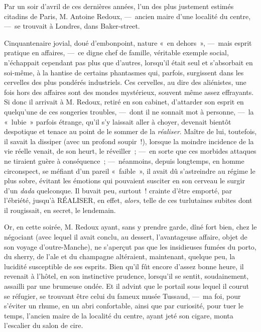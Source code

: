 \documentclass[french,twoside]{book} %
\newcommand{\bibl}[1]{{\RaggedLeft{#1}\par\bigskip}}
\begin{document}
\bibl{Xavier Aubryet.}
\noindent Par un soir d’avril de ces dernières années, l’un des plus justement estimés citadins de Paris, M. Antoine Redoux, — ancien maire d’une localité du centre, — se trouvait à Londres, dans Baker-street.\par
Cinquantenaire jovial, doué d’embonpoint, nature « en dehors », — mais esprit pratique en affaires, — ce digne chef de famille, véritable exemple social, n’échappait cependant pas plus que d’autres, lorsqu’il était seul et s’absorbait en soi-même, à la hantise de certains phantasmes qui, parfois, surgissent dans les cervelles des plus pondérés industriels. Ces cervelles, au   dire des aliénistes, une fois hors des affaires sont des mondes mystérieux, souvent même assez effrayants. Si donc il arrivait à M. Redoux, retiré en son cabinet, d’attarder son esprit en quelqu’une de ces songeries troubles, — dont il ne sonnait mot à personne, — la « lubie » parfois étrange, qu’il s’y laissait aller à choyer, devenait bientôt despotique et tenace au point de le sommer de la \emph{réaliser}. Maître de lui, toutefois, il savait la dissiper (avec un profond soupir !), lorsque la moindre incidence de la vie réelle venait, de son heurt, le réveiller ; — en sorte que ces morbides attaques ne tiraient guère à conséquence ; — néanmoins, depuis longtemps, en homme circonspect, se méfiant d’un pareil « faible », il avait dû s’astreindre au régime le plus sobre, évitant les émotions qui pouvaient susciter en son cerveau le surgir d’un \emph{dada} quelconque. Il buvait peu, surtout ! crainte d’être emporté, par l’ébriété, jusqu’à RÉALISER, en effet, \emph{alors}, telle de ces turlutaines subites dont il rougissait, en secret, le lendemain.\par
   Or, en cette soirée, M. Redoux ayant, sans y prendre garde, dîné fort bien, chez le négociant (avec lequel il avait conclu, au dessert, l’avantageuse affaire, objet de son voyage d’outre-Manche), ne s’aperçut pas que les insidieuses fumées du porto, du sherry, de l’ale et du champagne altéraient, maintenant, quelque peu, la lucidité susceptible de ses esprits. Bien qu’il fût encore d’assez bonne heure, il revenait à l’hôtel, en son instinctive prudence, lorsqu’il se sentit, soudainement, assailli par une brumeuse ondée. Et il advint que le portail sous lequel il courut se réfugier, se trouvant être celui du fameux musée Tussaud, — ma foi, pour s’éviter un rhume, en un abri confortable, ainsi que par curiosité, pour tuer le temps, l’ancien maire de la localité du centre, ayant jeté son cigare, monta l’escalier du salon de cire.\par
\end{document}
